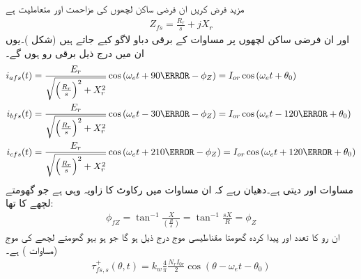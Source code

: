 مزید فرض کریں ان فرضی ساکن لچھوں کی مزاحمت   اور متعاملیت   ہے
\begin{align}
Z_{fs}=\frac{R_r}{s}+j X_r
\end{align}
اور ان فرضی ساکن لچھوں پر مساوات   کے برقی دباو لاگو کیے جاتے ہیں (شکل )۔یوں  ان میں درج ذیل برقی رو ہوں گے۔
\begin{gather}
\begin{aligned}
i_{afs}(t)&=\frac{E_r}{\sqrt{\left(\frac{R_r}{s} \right)^2+X_r^2}} \cos \left(\omega_e t+90\degree -\phi_Z  \right)=I_{or} \cos \left(\omega_e t+\theta_0 \right)\\
i_{bfs}(t)&=\frac{E_r}{\sqrt{\left(\frac{R_r}{s} \right)^2+X_r^2}} \cos \left(\omega_e t-30\degree -\phi_Z  \right)=I_{or}\cos \left(\omega_e t-120\degree +\theta_0 \right)\\
i_{cfs}(t)&=\frac{E_r}{\sqrt{\left(\frac{R_r}{s} \right)^2+X_r^2}} \cos \left(\omega_e t+210\degree -\phi_Z  \right)=I_{or} \cos \left(\omega_e t+120\degree+\theta_0 \right)
\end{aligned}
\end{gather}
مساوات    اور  دیتی ہے۔دھیان رہے کہ ان مساوات میں  رکاوٹ کا زاویہ   وہی ہے جو گھومتے لچھے کا تھا:
\begin{align}
\phi_{fZ}=\tan^{-1} \frac{X}{\left(\frac{R}{s} \right)}=\tan^{-1} \frac{s X}{R}=\phi_Z
\end{align}
ان  رو کا تعدد  اور پیدا کردہ گھومتا مقناطیسی موج درج ذیل ہو گا جو ہو بہو گھومتے لچھے کی موج  (مساوات ) ہے۔
\begin{align}
\tau_{fs,s}^+(\theta,t)=k_w \frac{4}{\pi}\frac{N_r I_{0r}}{2} \cos (\theta-\omega_e t-\theta_0)
\end{align}

